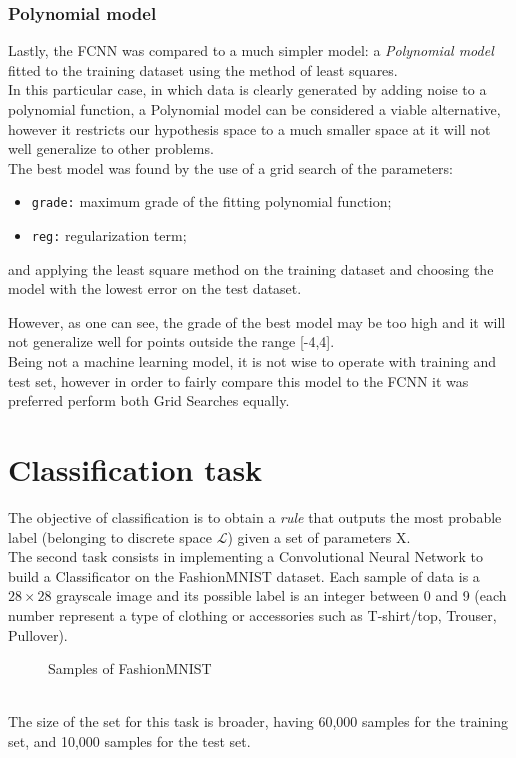 \documentclass[11pt,a4paper,twocolumn]{IEEEtran}
\begin{document}
				\subsubsection{Polynomial model}
					Lastly, the FCNN was compared to a much simpler model: a \textit{Polynomial model} fitted to the training dataset using the method of least squares.\\
					In this particular case, in which data is clearly generated by adding noise to a polynomial function, a Polynomial model can be considered a viable alternative, however it restricts our hypothesis space to a much smaller space at it will not well generalize to other problems.\medskip\\
					The best model was found by the use of a grid search of the parameters:
					\begin{itemize}
						\item \texttt{grade:} maximum grade of the fitting polynomial function;
						\item \texttt{reg:} regularization term;
					\end{itemize}
					and applying the least square method on the training dataset and choosing the model with the lowest error on the test dataset.\newpage
					\begin{figure}[h]
						\centering
						
					\end{figure}
					However, as one can see, the grade of the best model may be too high and it will not generalize well for points outside the range [-4,4].\medskip\\
					Being not a machine learning model, it is not wise to operate with training and test set, however in order to fairly compare this model to the FCNN it was preferred perform both Grid Searches equally.
	\section{\textbf{Classification task}}
		The objective of classification is to obtain a \textit{rule} that outputs the most probable label (belonging to discrete space $\mathcal{L}$) given a set of parameters X.\medskip\\
		The second task consists in implementing a Convolutional Neural Network to build a Classificator on the FashionMNIST dataset\cite{xiao2017fashion}. Each sample of data is a $28\times28$ grayscale image and its possible label is an integer between 0 and 9 (each number represent a type of clothing or accessories such as T-shirt/top, Trouser, Pullover).\vspace*{-.5cm}
		\begin{figure}[h]
			\centering
			
			\caption{Samples of FashionMNIST}
		\end{figure}\\
		The size of the set for this task is broader, having 60,000 samples for the training set, and 10,000 samples for the test set.
\end{document}
